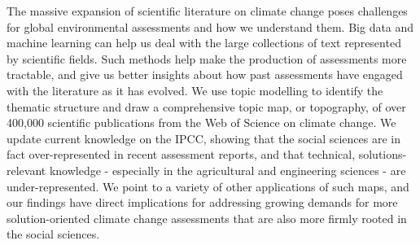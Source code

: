 \documentclass{article}
\begin{document}
   The massive expansion of scientific literature on climate change poses challenges for global environmental assessments and how we
understand them. 
Big data and machine learning can help us deal 
with the large collections of text represented by scientific fields.
Such methods help make the production of assessments
more tractable, and give us better insights about how past assessments  have engaged with the literature as it has evolved.
We use topic modelling to identify the thematic structure and draw a comprehensive topic map, or topography, of over 400,000 scientific publications from the Web of Science on climate change. 
We update current knowledge on the IPCC, showing that the social sciences are in fact over-represented in recent assessment reports, and that
technical, solutions-relevant knowledge - especially in the agricultural and engineering sciences - are under-represented.
We point to a variety of other applications of such maps, and our findings have direct implications for addressing growing demands for more solution-oriented climate change assessments that are also more firmly rooted in the social sciences.
\end{document}
